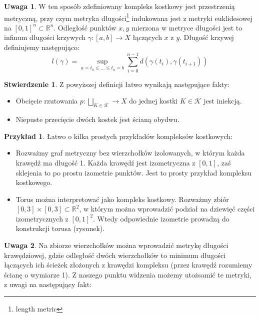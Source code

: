 \documentclass[licencjacka]{pracamgr}
\theoremstyle{definition}
\theoremstyle{definition}
\newtheorem{remark}{Uwaga}[section]
\theoremstyle{definition}
\newtheorem{proposition}{Stwierdzenie}[section]
\theoremstyle{definition}
\newtheorem{example}{Przykład}[section]
\theoremstyle{definition}
\theoremstyle{plain}
\theoremstyle{plain}
\begin{document}
\begin{remark}
	W ten sposób zdefiniowany kompleks kostkowy jest przestrzenią metryczną, przy czym 
	metryka długości\footnote{length metric} indukowana jest z metryki euklidesowej 
	na $ [0,1]^n \subset \mathbb{R}^n$. Odległość punktów $ x,y $ mierzona w metryce 
	długości jest to infinum długości krzywych $ \gamma : [a,b] \rightarrow X $ 
	łączących $ x$ z $ y $. Długość krzywej definiujemy następująco: 
	$$ l(\gamma) = \sup\limits_{a = t_0 \leq \dots \leq t_n = b} \sum\limits_{i=0}^{n-1}
	d(\gamma(t_i), \gamma(t_{i+1})) $$
\end{remark}
\begin{proposition}
	Z powyższej definicji łatwo wynikają następujące fakty:
	\begin{itemize}
	\item Obcięcie rzutowania $ p : \bigsqcup_{K \in \mathcal{K}} \rightarrow X$ do jednej 
	kostki $ K \in \mathcal{K}$ jest iniekcją.
	\item Niepuste przecięcie dwóch kostek jest ścianą obydwu.
	\end{itemize}	
\end{proposition}

\begin{example}
	Łatwo o kilka prostych przykładów kompleksów kostkowych:
	\begin{itemize}
	\item Rozważmy graf metryczny bez wierzchołków izolowanych, w którym każda krawędź ma 
	długość 1. Każda krawędź jest izometryczna z $ [0,1] $, zaś sklejenia to
	po prostu izometrie punktów. Jest to prosty przykład kompleksu kostkowego.
	\item Torus można interpretować jako kompleks kostkowy. Rozważmy zbiór 
	$ [0,3]\times[0,3] \subset \mathbb{R}^2 $, w którym można wprowadzić podział 
	na dziewięć części izometrycznych z $ [0,1]^2 $. Wtedy odpowiednie izometrie 
	prowadzą do konstrukcji torusa (rysunek).
	\end{itemize}
\end{example}


\begin{remark}
	Na zbiorze wierzchołków można wprowadzić metrykę długości krawędziowej, gdzie 
	odległość dwóch wierzchołków to minimum długości łączących ich ścieżek złożonych 
	z krawędzi kompleksu (przez krawędź rozumiemy ścianę o wymiarze 1).
	Z naszego punktu widzenia możemy utożsamić te metryki, z uwagi na następujący fakt:
\end{remark}
\end{document}
